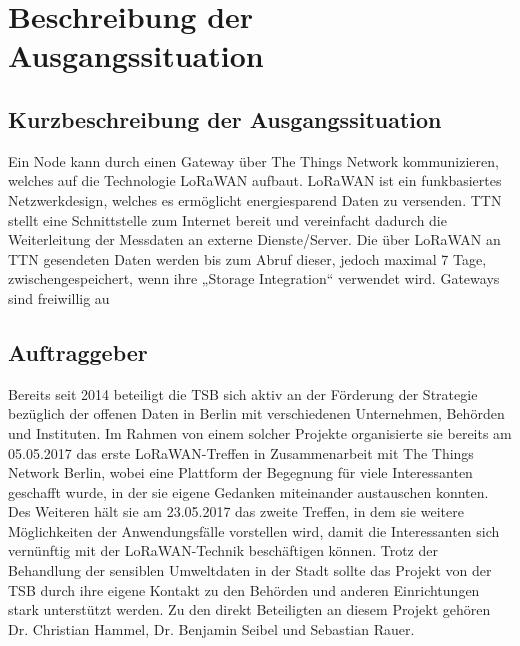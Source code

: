 \section{Beschreibung der Ausgangssituation}

\subsection{Kurzbeschreibung der Ausgangssituation}


Ein Node kann durch einen Gateway über The Things Network kommunizieren, welches auf die Technologie LoRaWAN aufbaut. LoRaWAN ist ein funkbasiertes Netzwerkdesign, welches es ermöglicht energiesparend Daten zu versenden. TTN stellt eine Schnittstelle zum Internet bereit und vereinfacht dadurch die Weiterleitung der Messdaten an externe Dienste/Server. Die über LoRaWAN an TTN gesendeten Daten werden bis zum Abruf dieser, jedoch maximal 7 Tage, zwischengespeichert, wenn ihre „Storage Integration“ verwendet wird.
Gateways sind freiwillig au

\subsection{Auftraggeber}


Bereits seit 2014 beteiligt die TSB sich aktiv an der Förderung der Strategie bezüglich der offenen Daten in Berlin mit verschiedenen Unternehmen, Behörden und Instituten.
Im Rahmen von einem solcher Projekte organisierte sie bereits am 05.05.2017 das erste \glqq LoRaWAN-Treffen\grqq{}  in Zusammenarbeit mit The Things Network Berlin, wobei eine Plattform der Begegnung für viele Interessanten geschafft wurde, in der sie eigene Gedanken miteinander austauschen konnten.
Des Weiteren hält sie am 23.05.2017 das zweite Treffen, in dem sie weitere Möglichkeiten der Anwendungsfälle vorstellen wird, damit die Interessanten sich vernünftig mit der LoRaWAN-Technik beschäftigen können.
Trotz der Behandlung der sensiblen Umweltdaten in der Stadt sollte das Projekt von der TSB durch ihre eigene Kontakt zu den Behörden und anderen Einrichtungen stark unterstützt werden.
Zu den direkt Beteiligten an diesem Projekt gehören Dr. Christian Hammel, Dr. Benjamin Seibel und Sebastian Rauer.

